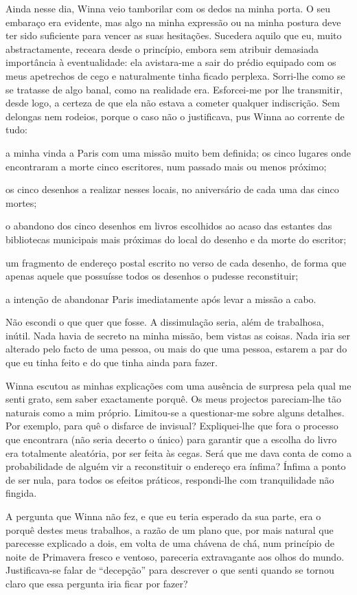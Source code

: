 Ainda nesse dia, Winna veio tamborilar com os dedos na minha porta. O
seu embaraço era evidente, mas algo na minha expressão ou na minha
postura deve ter sido suficiente para vencer as suas hesitações.
Sucedera aquilo que eu, muito abstractamente, receara desde o princípio,
embora sem atribuir demasiada importância à eventualidade: ela avistara-me
a sair do prédio equipado com os meus apetrechos de cego e
naturalmente tinha ficado perplexa. Sorri-lhe como se se tratasse de
algo banal, como na realidade era. Esforcei-me por lhe transmitir, desde
logo, a certeza de que ela não estava a cometer qualquer indiscrição.
Sem delongas nem rodeios, porque o caso não o justificava, pus Winna ao
corrente de tudo:

a minha vinda a Paris com uma missão muito bem definida; os cinco
lugares onde encontraram a morte cinco escritores, num passado mais ou menos próximo;

os cinco desenhos a realizar nesses locais, no aniversário de cada uma
das cinco mortes;

o abandono dos cinco desenhos em livros escolhidos ao acaso das estantes
das bibliotecas municipais mais próximas do local do desenho e da morte
do escritor;

um fragmento de endereço postal escrito no verso de cada desenho, de
forma que apenas aquele que possuísse todos os desenhos o pudesse
reconstituir;

a intenção de abandonar Paris imediatamente após levar a missão a cabo.

Não escondi o que quer que fosse. A dissimulação seria, além de
trabalhosa, inútil. Nada havia de secreto na minha missão, bem vistas as
coisas. Nada iria ser alterado pelo facto de uma pessoa, ou mais do que
uma pessoa, estarem a par do
que eu tinha feito e do que tinha ainda para fazer.

Winna escutou as minhas explicações com uma ausência de surpresa pela
qual me senti grato, sem saber exactamente porquê. Os meus projectos
pareciam-lhe tão naturais como a mim próprio. Limitou-se a questionar-me
sobre alguns detalhes. Por exemplo, para quê o disfarce de invisual?
Expliquei-lhe que fora o processo que encontrara (não seria decerto o único) para
garantir que a escolha do livro era totalmente aleatória, por ser feita
às cegas. Será que me dava conta de como a probabilidade de alguém vir a
reconstituir o endereço era ínfima? Ínfima a ponto de ser nula, para
todos os efeitos práticos, respondi-lhe com tranquilidade não fingida.

A pergunta que Winna não fez, e que eu teria esperado da sua parte, era
o porquê destes meus trabalhos, a razão de um plano que, por mais
natural que parecesse explicado a dois, em volta de uma chávena de chá,
num princípio de noite de Primavera fresco e ventoso, pareceria
extravagante aos olhos do mundo. Justificava-se falar de ``decepção''
para descrever o que senti quando se tornou claro que essa pergunta iria
ficar por fazer?

